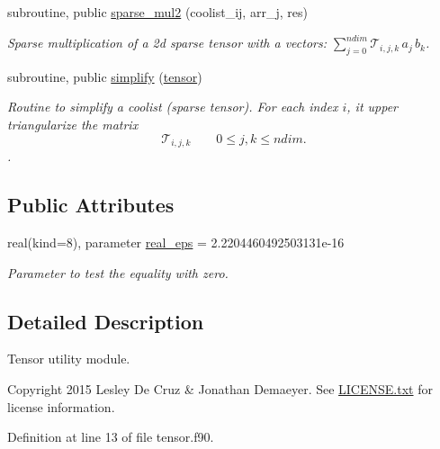 \begin{DoxyCompactItemize}
subroutine, public \hyperlink{classtensor_a70230d57c615d9548905bc023f5fc01d}{sparse\-\_\-mul2} (coolist\-\_\-ij, arr\-\_\-j, res)
\begin{DoxyCompactList}\small\item\em Sparse multiplication of a 2d sparse tensor with a vectors\-: ${\displaystyle \sum_{j=0}^{ndim}} \mathcal{T}_{i,j,k} \, a_j \,b_k$. \end{DoxyCompactList}\item 
subroutine, public \hyperlink{classtensor_a364522b80ab0f4785c331eb74fa1ba04}{simplify} (\hyperlink{classtensor}{tensor})
\begin{DoxyCompactList}\small\item\em Routine to simplify a coolist (sparse tensor). For each index $i$, it upper triangularize the matrix \[\mathcal{T}_{i,j,k} \qquad 0 \leq j,k \leq ndim.\]. \end{DoxyCompactList}\end{DoxyCompactItemize}
\subsection*{Public Attributes}
\begin{DoxyCompactItemize}
\item 
real(kind=8), parameter \hyperlink{classtensor_a2a2ab182d86107e62533c3f0043652cc}{real\-\_\-eps} = 2.\-2204460492503131e-\/16
\begin{DoxyCompactList}\small\item\em Parameter to test the equality with zero. \end{DoxyCompactList}\end{DoxyCompactItemize}


\subsection{Detailed Description}
Tensor utility module. 

\begin{DoxyCopyright}{Copyright}
2015 Lesley De Cruz \& Jonathan Demaeyer. See \hyperlink{LICENSE_8txt}{L\-I\-C\-E\-N\-S\-E.\-txt} for license information. 
\end{DoxyCopyright}


Definition at line 13 of file tensor.\-f90.



